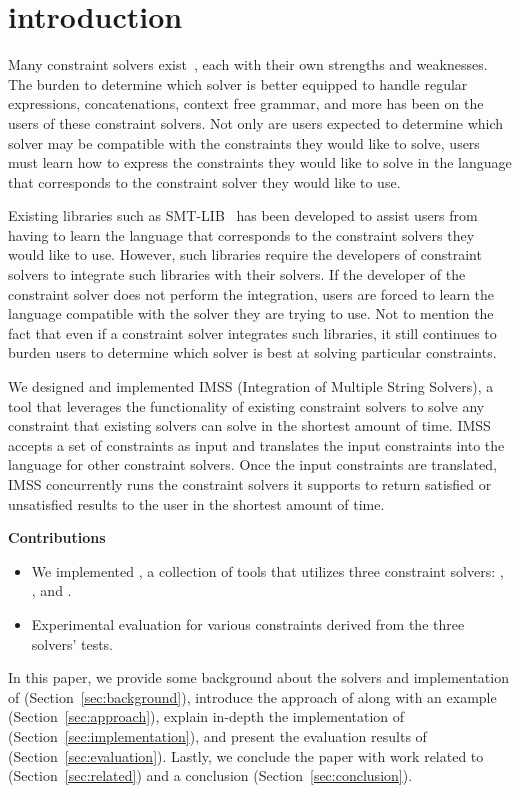 \section{introduction}
\label{sec:introduction}
Many constraint solvers exist~\cite{solvers}, each with their own strengths and weaknesses. The burden to determine which solver is better equipped to handle regular expressions, concatenations, context free grammar, and more has been on the users of these constraint solvers. Not only are users expected to determine which solver may be compatible with the constraints they would like to solve, users must learn how to express the constraints they would like to solve in the language that corresponds to the constraint solver they would like to use.

Existing libraries such as SMT-LIB~\cite{smtlib2015} has been developed to assist users from having to learn the language that corresponds to the constraint solvers they would like to use. However, such libraries require the developers of constraint solvers to integrate such libraries with their solvers. If the developer of the constraint solver does not perform the integration, users are forced to learn the language compatible with the solver they are trying to use. Not to mention the fact that even if a constraint solver integrates such libraries, it still continues to burden users to determine which solver is best at solving particular constraints.

We designed and implemented IMSS (Integration of Multiple String Solvers), a tool that leverages the functionality of existing constraint solvers to solve any constraint that existing solvers can solve in the shortest amount of time. IMSS accepts a set of constraints as input and translates the input constraints into the language for other constraint solvers. Once the input constraints are translated, IMSS concurrently runs the constraint solvers it supports  to return satisfied or unsatisfied results to the user in the shortest amount of time.

\textbf{Contributions}
\begin{itemize}
    \item We implemented \imss, a collection of tools that utilizes three constraint solvers:
    \hampi, \dprle, and \zstr.
    \item Experimental evaluation for various constraints derived from the three solvers' tests.
\end{itemize}

In this paper, we provide some background about the solvers and implementation of \imss (Section~\ref{sec:background}), introduce the approach of \imss along with
an example (Section~\ref{sec:approach}), explain in-depth the
implementation of \imss (Section~\ref{sec:implementation}), and present the evaluation
results of \imss (Section~\ref{sec:evaluation}). Lastly, we conclude the paper with work related to \imss
(Section~\ref{sec:related}) and a conclusion (Section~\ref{sec:conclusion}).
